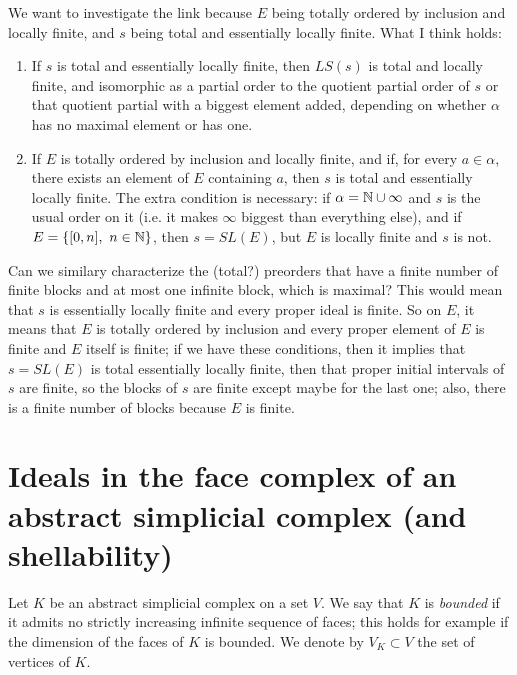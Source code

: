 We want to investigate the link because $E$ being totally ordered by inclusion and locally finite, and $s$ being total and essentially locally finite. What I think holds:
\begin{enumerate}
\item If $s$ is total and essentially locally finite, then $LS(s)$ is total and locally finite, and isomorphic as a partial order to the quotient partial order of $s$ or that
quotient partial with a biggest element added, depending on whether $\alpha$ has no maximal element or has one.

\item If $E$ is totally ordered by inclusion and locally finite, and if, for every $a\in\alpha$, there exists an element of $E$ containing $a$, then $s$ is total and essentially
locally finite. The extra condition is necessary: if $\alpha=\mathbb{N}\cup{\infty}$ and $s$ is the usual order on it (i.e. it makes $\infty$ biggest than everything else), and if 
$E=\{[0,n],\ n\in\mathbb{N}\}$, then $s=SL(E)$, but $E$ is locally finite and $s$ is not.

\end{enumerate}

Can we similary characterize the (total?) preorders that have a finite number of finite blocks and at most one infinite block, which is maximal? This would mean that $s$ is 
essentially locally finite and every proper ideal is finite. So on $E$, it means that $E$ is totally ordered by inclusion and every proper element of $E$ is finite and $E$ itself
is finite; if we have these conditions, then it implies that $s=SL(E)$ is total essentially locally finite, then that proper initial intervals of $s$ are finite, so the blocks of $s$
are finite except maybe for the last one; also, there is a finite number of blocks because $E$ is finite.


\section{Ideals in the face complex of an abstract simplicial complex (and shellability)}

Let $K$ be an abstract simplicial complex on a set $V$. We say that $K$ is \emph{bounded} if it admits no strictly increasing infinite sequence of faces; this holds for example if the dimension
of the faces of $K$ is bounded. We denote by $V_K\subset V$ the set of vertices of $K$.

